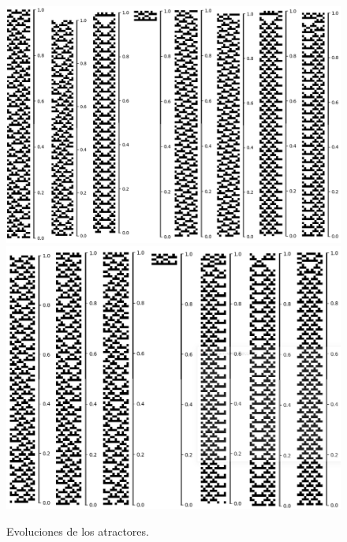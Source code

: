 \documentclass[11pt]{article}
\begin{document}
			\begin{figure}[H]
			\centering
			\includegraphics[scale=0.3]{resources/Atractores54/atractor_54_size_11_res.png}
			\includegraphics[scale=0.3]{resources/Atractores54/atractor_54_size_11_res1.png}
			\caption{Evoluciones de los atractores.}\label{fig:picture}
			\end{figure}
\end{document}

